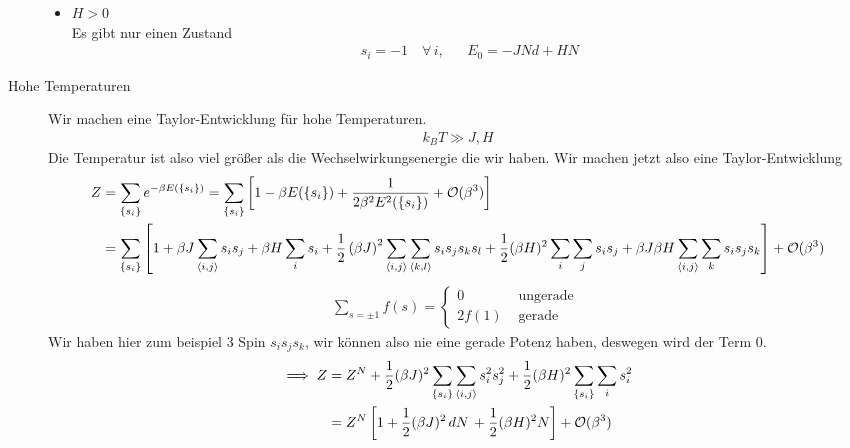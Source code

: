\begin{description}
\begin{itemize}
      \item $H > 0$ \\
        Es gibt nur einen Zustand 
        \begin{align*}
          s_i = -1 \quad\forall\, i, && E_0 = - J N d + H N
        \end{align*}
    \end{itemize}
  \item[Hohe Temperaturen] Wir machen eine Taylor-Entwicklung für hohe Temperaturen.
    \begin{align*}
      k_B T \gg J, H
    \end{align*}
    Die Temperatur ist also viel größer als die Wechselwirkungsenergie die wir haben.
    Wir machen jetzt also eine Taylor-Entwicklung
    \begin{align*}
      Z & = \sum_{ \{s_i\} }^{} e^{-\beta E (\{s_i\})} = \sum_{\{s_i\}}^{}
      \left[ 1 - \beta E (\{s_i\}) + \frac{1}{2 \beta^2 E^2 (\{s_i\})} + \mathcal{O}(\beta^3) \right] \\
       & = \sum_{\{s_i\}}^{} \left[ 1+ \beta J \sum_{\Braket{i,j}}^{}
        s_i s_j + \beta H \sum_{i}^{} s_i + \frac{1}{2} \left( \beta J \right)^2
         \sum_{\Braket{i,j}}^{} \sum_{\Braket{k, l}}^{} s_i s_j s_k s_l  + \frac{1}{2} (\beta H )^2 \sum_{i}^{} \sum_{j}^{} s_i s_j
         + \beta J \beta H \sum_{\Braket{i,j}}^{} \sum_{k}^{} s_i s_j s_k
       \right] + \mathcal{O}(\beta^3)
    \end{align*}
    \begin{align*}
      \sum_{s = \pm 1}^{} f(s) = \begin{cases}
        0 & \text{ ungerade } \\
        2 f(1) & \text{ gerade}
      \end{cases} 
    \end{align*}
    Wir haben hier zum beispiel 3 Spin $s_i s_j s_k$, wir können also nie eine gerade 
    Potenz haben, deswegen wird der Term 0.
    \begin{align*}
      \implies Z & = Z^N + \frac{1}{2}(\beta J)^2 \sum_{\{s_i\}}^{} \sum_{\Braket{i,j}}^{} 
      s_i^2 s_j^2 + \frac{1}{2} (\beta H)^2 \sum_{\{s_i\}}^{} \sum_{i}^{} s_i^2  \\
      & = Z^N \left[ 1 + \frac{1}{2} (\beta J)^2 \,dN\, + \frac{1}{2} (\beta H)^2 N \right]
      + \mathcal{O}(\beta^3)
    \end{align*}
    \begin{align*}

\end{align*}
\end{description}
